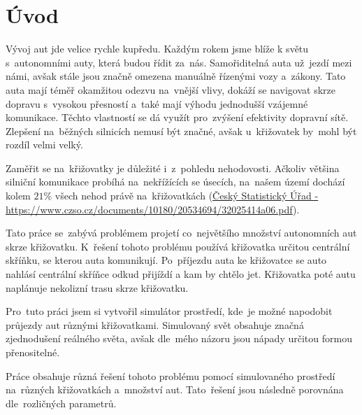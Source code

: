 \chapter*{Úvod}\label{ch:uvod}

Vývoj aut jde velice rychle kupředu.
Každým rokem jsme blíže k světu s~autonomními auty, která budou řídit za~nás.
Samořiditelná auta už~jezdí mezi námi, avšak stále jsou značně omezena manuálně řízenými vozy a~zákony.
Tato auta mají téměř okamžitou odezvu na~vnější vlivy, dokáží se navigovat skrze dopravu s~vysokou přesností
a~také mají výhodu jednodušší vzájemné komunikace.
Těchto vlastností se dá využít pro~zvýšení efektivity dopravní sítě.
Zlepšení na~běžných silnicích nemusí být značné, avšak u~křižovatek by~mohl být rozdíl velmi velký.

Zaměřit se na~křižovatky je důležité i~z~pohledu nehodovosti.
Ačkoliv většina silniční komunikace probíhá na~nekřížících se úsecích, na~našem území dochází kolem $21\%$ všech nehod
právě na~křižovatkách (\href{https://www.czso.cz/documents/10180/20534694/32025414a06.pdf}
{Český Statistický Úřad - https://www.czso.cz/documents/10180/20534694/32025414a06.pdf}).

Tato práce se~zabývá problémem projetí co~největšího množství autonomních aut skrze křižovatku.
K~řešení tohoto problému používá křižovatka určitou centrální skříňku, se kterou auta komunikují.
Po~příjezdu auta ke křižovatce se auto nahlásí centrální skříňce odkud přijíždí a kam by chtělo jet.
Křižovatka poté autu naplánuje nekolizní trasu skrze křižovatku.

Pro~tuto práci jsem si vytvořil simulátor prostředí, kde~je možné napodobit průjezdy aut různými křižovatkami.
Simulovaný svět obsahuje značná zjednodušení reálného světa, avšak dle~mého názoru jsou nápady určitou formou přenositelné.

Práce obsahuje různá řešení tohoto problému pomocí simulovaného prostředí na~různých křižovatkách a~množství aut.
Tato~řešení jsou následně porovnána dle~rozličných parametrů.
